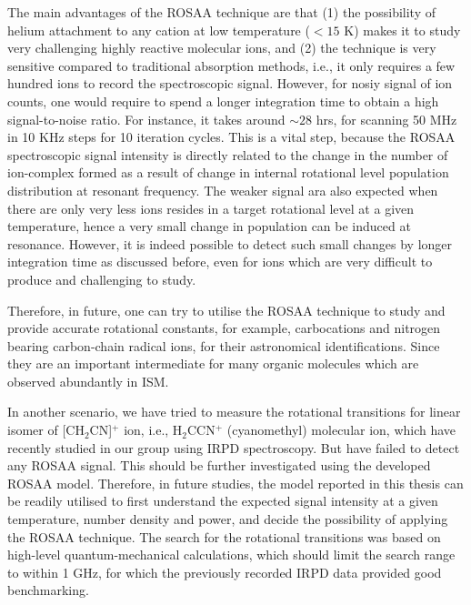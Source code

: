 The main advantages of the ROSAA technique are that (1) the possibility of helium attachment to any cation at 
low temperature ($< 15$ K) makes it to study very challenging highly reactive molecular ions, 
and (2) the technique is very sensitive compared to traditional absorption methods, 
i.e., it only requires a few hundred ions to record the spectroscopic signal.
However, for nosiy signal of ion counts, one would require to spend a longer integration time
to obtain a high signal-to-noise ratio. For instance, it takes around $\sim 28$ hrs, 
for scanning 50 MHz in 10 KHz steps for 10 iteration cycles. This is a vital step, because 
the ROSAA spectroscopic signal intensity is directly related to the change in the number of ion-complex 
formed as a result of change in internal rotational level population distribution at resonant frequency.
The weaker signal ara also expected when there are only very less ions 
resides in a target rotational level at a given temperature, hence a very small change 
in population can be induced at resonance. However, it is indeed possible to detect 
such small changes by longer integration time as discussed before, even for ions which are very difficult 
to produce and challenging to study.

Therefore, in future, one can try to utilise the ROSAA technique to 
study and provide accurate rotational constants, for example, carbocations and 
nitrogen bearing carbon-chain radical ions, for their astronomical 
identifications. Since they are an important intermediate for many organic molecules 
which are observed abundantly in ISM.


In another scenario, we have tried to measure the rotational transitions for linear isomer of [CH$_2$CN]$^+$ ion, i.e., H$_2$CCN$^+$ (cyanomethyl) molecular ion, which have recently studied in our group using IRPD spectroscopy. But have failed to detect any ROSAA signal. This should be further investigated using the developed ROSAA model. Therefore, in future studies, the model reported in this thesis can be readily utilised to first understand the expected signal intensity at a given temperature, number density and power, and decide the possibility of applying the ROSAA technique. The search for the rotational transitions was based on high-level quantum-mechanical calculations, which should limit the search range to within 1 GHz, for which the previously recorded IRPD data provided good benchmarking.

